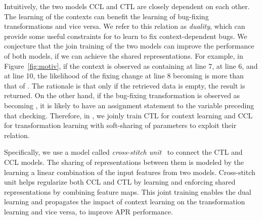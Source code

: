 Intuitively, the two models CCL and CTL are closely dependent on each
other. The learning of the contexts can benefit the learning of
bug-fixing transformations and vice versa. We refer to this relation
as {\em duality}, which can provide some useful constraints for
{\tool} to learn to fix context-dependent bugs. We conjecture that the
join training of the two models can improve the performance of both
models, if we can achieve the shared representations. For example, in
Figure~\ref{fig:motiv}, if the context is observed as containing
 at line 7,  at line 6, and
 at line 10, the likelihood of the fixing change
at line 8 becoming  is more than that of
. The rationale is that only if the retrieved
data is empty, the result is returned. On the other hand, if the
bug-fixing transformation is observed as 
becoming , it is likely to have an assignment
statement to the variable  preceding that checking.
Therefore, in {\tool}, we joinly train CTL for context learning and
CCL for transformation learning with soft-sharing of parameters to
exploit their relation.

Specifically, we use a model called {\em cross-stitch
unit}~\cite{misra2016cross} to connect the CTL and CCL models. The
sharing of representations between them is modeled by the learning a
linear combination of the input features from two models. Cross-stitch
unit helps regularize both CCL and CTL by learning and enforcing
shared representations by combining feature maps. This joint training
enables the dual learning and propagates the impact of context
learning on the transformation learning and vice versa, to improve APR
performance.
